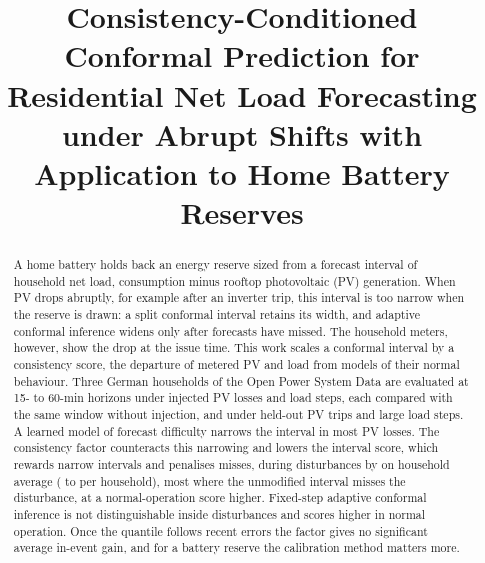 \documentclass[conference,a4paper]{IEEEtran}
\begin{document}

\title{Consistency-Conditioned Conformal Prediction for Residential Net Load Forecasting under Abrupt Shifts
with Application to Home Battery Reserves}

\author{
}

\maketitle

\begin{abstract}
A home battery holds back an energy reserve sized from a forecast interval of household net load, consumption
minus rooftop photovoltaic (PV) generation. When PV drops abruptly, for example after an inverter trip, this
interval is too narrow when the reserve is drawn: a split conformal interval retains its width, and adaptive
conformal inference widens only after forecasts have missed. The household meters, however, show the drop at the
issue time. This work scales a conformal interval by a consistency score, the departure of metered PV and load from
models of their normal behaviour. Three German households of the Open Power System Data are evaluated at 15- to
60-min horizons under injected PV losses and load steps, each compared with the same window without injection, and
under held-out PV trips and large load steps. A learned model of forecast difficulty narrows the interval in most
PV losses. The consistency factor counteracts this narrowing and lowers the interval score, which rewards narrow
intervals and penalises misses, during disturbances by \absrelCCLACPvsLACP{} on household average
(\relCCLACPvsLACPHSix{} to \relCCLACPvsLACPHThree{} per household), most where the unmodified interval misses the
disturbance, at a normal-operation score \abscleanrelCCLACP{} higher. Fixed-step adaptive conformal inference
is not distinguishable inside disturbances and scores higher in normal operation. Once the quantile follows recent
errors the factor gives no significant average in-event gain, and for a battery reserve the calibration method
matters more.
\end{abstract}
\end{document}
